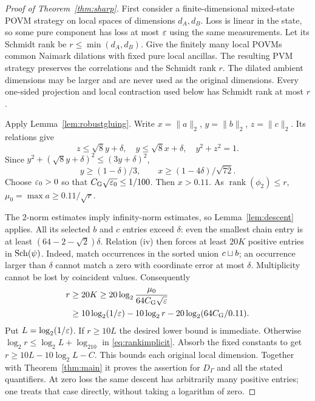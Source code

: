 \begin{proof}[Proof of Theorem~\ref{thm:sharp}]
First consider a finite-dimensional mixed-state POVM strategy on local
spaces of dimensions $d_A,d_B$. Loss is linear in the state, so some
pure component has loss at most $\varepsilon$ using the same measurements.
Let its Schmidt rank be $r\leq\min(d_A,d_B)$.
Give the finitely many local POVMs common Naimark dilations with fixed
pure local ancillas. The resulting PVM strategy preserves the
correlations and the Schmidt rank $r$. The dilated ambient dimensions
may be larger and are never used as the original dimensions. Every
one-sided projection and local contraction used below has Schmidt rank
at most $r$.

Apply Lemma~\ref{lem:robustgluing}. Write
$x=\|a\|_2$, $y=\|b\|_2$, $z=\|c\|_2$.
Its relations give
\[
z\leq\sqrt8y+\delta,\quad y\leq\sqrt8x+\delta,\quad y^2+z^2=1.
\]
Since $y^2+(\sqrt8y+\delta)^2\leq(3y+\delta)^2$,
\begin{equation}\label{eq:sectorweight}
y\geq(1-\delta)/3,\qquad
x\geq(1-4\delta)/\sqrt{72}.
\end{equation}
Choose $\varepsilon_0>0$ so that $C_{\rm G}\sqrt{\varepsilon_0}\leq1/100$.
Then $x>0.11$. As $\operatorname{rank}(\phi_2)\leq r$,
$\mu_0=\max a\geq0.11/\sqrt r$.

The 2-norm estimates imply infinity-norm estimates, so
Lemma~\ref{lem:descent} applies. All its selected $b$ and $c$ entries
exceed $\delta$: even the smallest chain entry is at least
$(64-2-\sqrt2)\delta$.
Relation (iv) then forces at least $20K$ positive entries in
$\operatorname{Sch}(\psi)$. Indeed, match occurrences in the sorted union
$c\sqcup b$; an occurrence larger than $\delta$ cannot match a zero
with coordinate error at most $\delta$. Multiplicity cannot be lost
by coincident values. Consequently
\begin{align}\label{eq:rankimplicit}
r&\geq20K\geq20\log_2\frac{\mu_0}{64C_{\rm G}\sqrt{\varepsilon}}\nonumber\\
&\geq10\log_2(1/\varepsilon)-10\log_2r
 -20\log_2(64C_{\rm G}/0.11).
\end{align}
Put $L=\log_2(1/\varepsilon)$. If $r\geq10L$ the desired lower bound is
immediate. Otherwise $\log_2r\leq\log_2L+\log_210$ in
\eqref{eq:rankimplicit}. Absorb the fixed constants to get
$r\geq10L-10\log_2L-C$. This bounds each original local dimension.
Together with Theorem~\ref{thm:main} it proves the assertion for
$D_\Gamma$ and all the stated quantifiers.
At zero loss the same descent has arbitrarily many positive entries;
one treats that case directly, without taking a logarithm of zero.
\end{proof}
